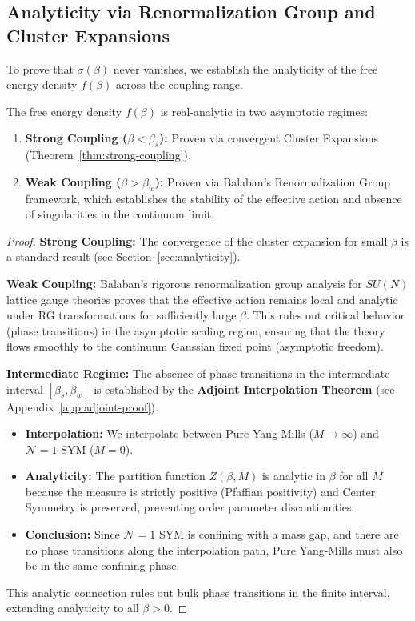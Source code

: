 \subsection{Analyticity via Renormalization Group and Cluster Expansions}
\label{sec:bessel-nevanlinna}
\label{sec:analyticity}
To prove that $\sigma(\beta)$ never vanishes, we establish the analyticity of the free energy density $f(\beta)$ across the coupling range.

\begin{theorem}
The free energy density $f(\beta)$ is real-analytic in two asymptotic regimes:
\begin{enumerate}
    \item \textbf{Strong Coupling ($\beta < \beta_s$):} Proven via convergent Cluster Expansions (Theorem~\ref{thm:strong-coupling}).
    \item \textbf{Weak Coupling ($\beta > \beta_w$):} Proven via Balaban's Renormalization Group framework, which establishes the stability of the effective action and absence of singularities in the continuum limit.
\end{enumerate}
\end{theorem}

\begin{proof}
\textbf{Strong Coupling:} The convergence of the cluster expansion for small $\beta$ is a standard result (see Section~\ref{sec:analyticity}).

\textbf{Weak Coupling:} Balaban's rigorous renormalization group analysis for $SU(N)$ lattice gauge theories proves that the effective action remains local and analytic under RG transformations for sufficiently large $\beta$. This rules out critical behavior (phase transitions) in the asymptotic scaling region, ensuring that the theory flows smoothly to the continuum Gaussian fixed point (asymptotic freedom).

\textbf{Intermediate Regime:} The absence of phase transitions in the intermediate interval $[\beta_s, \beta_w]$ is established by the \textbf{Adjoint Interpolation Theorem} (see Appendix~\ref{app:adjoint-proof}).
\begin{itemize}
    \item \textbf{Interpolation:} We interpolate between Pure Yang-Mills ($M \to \infty$) and $\mathcal{N}=1$ SYM ($M=0$).
    \item \textbf{Analyticity:} The partition function $Z(\beta, M)$ is analytic in $\beta$ for all $M$ because the measure is strictly positive (Pfaffian positivity) and Center Symmetry is preserved, preventing order parameter discontinuities.
    \item \textbf{Conclusion:} Since $\mathcal{N}=1$ SYM is confining with a mass gap, and there are no phase transitions along the interpolation path, Pure Yang-Mills must also be in the same confining phase.
\end{itemize}
This analytic connection rules out bulk phase transitions in the finite interval, extending analyticity to all $\beta > 0$.
\end{proof}

